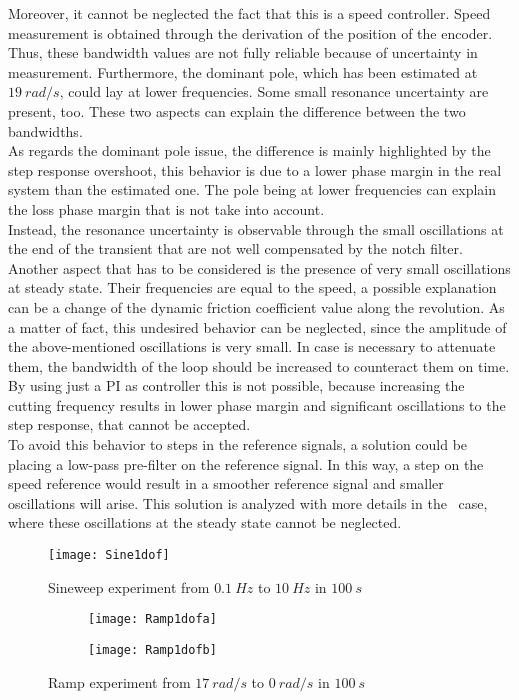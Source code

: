 Moreover, it cannot be neglected the fact that this is a speed controller. Speed measurement is obtained through the derivation of the position of the encoder. Thus, these bandwidth values are not fully reliable because of uncertainty in measurement. 
Furthermore, the dominant pole, which has been estimated at~$19\ rad/s$, could lay at lower frequencies. Some small resonance uncertainty are present, too. These two aspects can explain the difference between the two bandwidths. \\
As regards the dominant pole issue, the difference is mainly highlighted by the step response overshoot, this behavior is due to a lower phase margin in the real system than the estimated one. The pole being at lower frequencies can explain the loss phase margin that is not take into account. \\
Instead, the resonance uncertainty is observable through the small oscillations at the end of the transient that are not well compensated by the notch filter. \\

Another aspect that has to be considered is the presence of very small oscillations at steady state. Their frequencies are equal to the speed, a possible explanation can be a change of the dynamic friction coefficient value along the revolution. As a matter of fact, this undesired behavior can be neglected, since the amplitude of the above-mentioned oscillations is very small. In case is necessary to attenuate them, the bandwidth of the loop should be increased to counteract them on time. By using just a PI as controller this is not possible, because increasing the cutting frequency results in lower phase margin and significant oscillations to the step response, that cannot be accepted. \\
To avoid this behavior to steps in the reference signals, a solution could be placing a low-pass pre-filter on the reference signal. In this way, a step on the speed reference would result in a smoother reference signal and smaller oscillations will arise. This solution is analyzed with more details in the \twodof\ case, where these oscillations at the steady state cannot be neglected.
\begin{figure*}[h]
	\centering
	\texttt{[image: Sine1dof]}
	\caption{Sineweep experiment from $0.1\ Hz$ to $10\ Hz$ in $100\ s$}
	\label{fig:sinesweep_PI_1dof}
\end{figure*}

\begin{figure*}[h]
	\centering
	\begin{subfigure}{0.4\columnwidth}
		\texttt{[image: Ramp1dofa]}
	\end{subfigure}
	\begin{subfigure}{0.4\columnwidth}
		\texttt{[image: Ramp1dofb]}
	\end{subfigure}
	\caption{Ramp experiment from $17\ rad/s$ to $0\ rad/s$ in $100\ s$}
	\label{fig:Ramp1dof}
\end{figure*}

